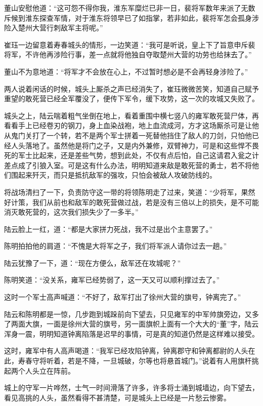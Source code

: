 董山安慰他道：“这可怨不得你我，淮东军糜烂已非一日，裴将军数年来派了无数斥候到淮东探查军情，对于淮东将领早已了如指掌，若非如此，裴将军怎会孤身涉险入楚州大营行刺敌军主将呢。”

崔珏一边留意着寿春城头的情形，一边笑道：“我可是听说，皇上下了旨意申斥裴将军，不许他再涉险行事，差一点就将他独自夺取楚州大营的功劳也给抹去了。”

董山不为意地道：“将军才不会放在心上，不过暂时想必是不会再轻身涉险了。”

两人说着闲话的时候，城头上厮杀之声已经消失了，崔珏微微苦笑，知道自己赋予重望的敢死营已经全军覆没了，便传下军令，缓下攻势，这一次的攻城又失败了。

城头之上，陆云喘着粗气坐倒在地上，看着重围中横七竖八的雍军敢死营尸体，再看看手上已经卷刃的钢刀，身上血染战袍，地上血流成河，方才这场厮杀可是让他从鬼门关打了一个转，若不是两个军士拼着一死替他挡住了敌人的刀剑，只怕他已经人头落地了。虽然他是将门之子，又是内外兼修，双臂神力，可是和这些悍不畏死的军士比起来，还是差些气势，想到此处，不仅有点后怕，自己这请君入瓮之计差点成了引狼入室。可是这有什么办法，明明知道来敌是敢死营的勇士，若不将他们围起来歼灭，而只是抵抗敌军的强攻，只怕会被敌人攻破防线的。

将战场清扫了一下，负责防守这一带的将领陈明走了过来，笑道：“少将军，果然好计策，我们从前也和敌军的敢死营做过战，若是没有三倍以上的损失，是不可能消灭敢死营的，这次我们损失少了一多半。”

陆云脸上一红，道：“都是大家拼力死战，我不过是出个主意罢了。”

陈明拍拍他的肩道：“不愧是大将军之子，我们将军派人请你过去一趟。”

陆云犹豫了一下，道：“现在方便么，敌军还在攻城呢？”

陈明笑道：“没关系，雍军已经势弱了，这一天又可以顺利撑过去了。”

这时一个军士高声喊道：“不好了，敌军打出了徐州大营的旗号，钟离完了。”

陆云和陈明都是一惊，几步跑到城跺前向下望去，只见雍军的中军帅旗旁边，又多了两面大旗，一面是徐州大营的旗号，另一面旗帜上面有一个大大的“董”字，陆云浑身一震，明明知道钟离陷落是迟早的事情，可是真的知道仍然是这样难以接受。

这时，雍军中有人高声喝道：“我军已经攻陷钟离，钟离郡守和钟离都尉的人头在此，寿春守将听着，若是不降，一旦城破，尔等也将悬首城门。”说着有人用旗杆挑起两个人头立在阵前。

城上的守军一片哗然，士气一时间滑落了许多，许多将士涌到城墙边，向下望去，看见高挑的人头，虽然看得不甚清楚，可是城头上已经是一片愁云惨雾。

